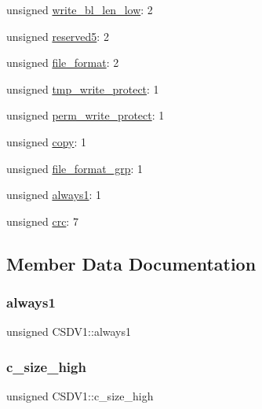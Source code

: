 \begin{DoxyCompactItemize}
\item 
unsigned \hyperlink{struct_c_s_d_v1_a57c6fb1515a4377af6c642c5d66f7a35}{write\+\_\+bl\+\_\+len\+\_\+low}\+: 2
\item 
unsigned \hyperlink{struct_c_s_d_v1_ab19ce641d4e1ed12241f3519836c30dc}{reserved5}\+: 2
\item 
unsigned \hyperlink{struct_c_s_d_v1_a537754d4987f7c51d5a67b66d8870cf5}{file\+\_\+format}\+: 2
\item 
unsigned \hyperlink{struct_c_s_d_v1_a79be71efc43a4706a1f1fd6023f574db}{tmp\+\_\+write\+\_\+protect}\+: 1
\item 
unsigned \hyperlink{struct_c_s_d_v1_a56bd241d539d5a48b97a64587908e55d}{perm\+\_\+write\+\_\+protect}\+: 1
\item 
unsigned \hyperlink{struct_c_s_d_v1_a59b32955a2955914ad68a5207da3634e}{copy}\+: 1
\item 
unsigned \hyperlink{struct_c_s_d_v1_a39a7305faa36816b35635cbc6a6810dd}{file\+\_\+format\+\_\+grp}\+: 1
\item 
unsigned \hyperlink{struct_c_s_d_v1_a5d5093fb1a3d7414f1f26158cc522339}{always1}\+: 1
\item 
unsigned \hyperlink{struct_c_s_d_v1_a2d5f23ba505a0a139bdc685bd50c2ef1}{crc}\+: 7
\end{DoxyCompactItemize}


\subsection{Member Data Documentation}
\mbox{\label{struct_c_s_d_v1_a5d5093fb1a3d7414f1f26158cc522339}} 
\subsubsection{\texorpdfstring{always1}{always1}}
{\footnotesize\ttfamily unsigned C\+S\+D\+V1\+::always1}

\mbox{\label{struct_c_s_d_v1_a1db393dada90b094020d05ee296ae6e4}} 
\subsubsection{\texorpdfstring{c\+\_\+size\+\_\+high}{c\_size\_high}}
{\footnotesize\ttfamily unsigned C\+S\+D\+V1\+::c\+\_\+size\+\_\+high}

